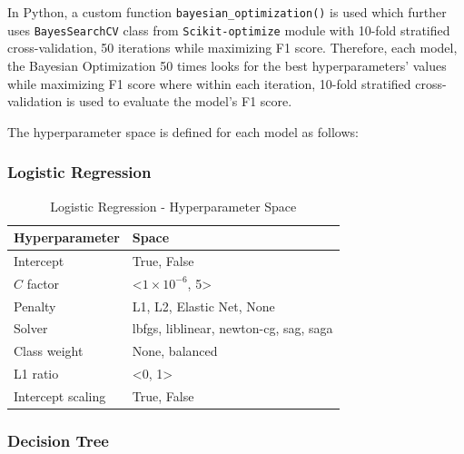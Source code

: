 In Python, a custom function \lstinline{bayesian_optimization()} is used which further uses \lstinline{BayesSearchCV} class from \lstinline{Scikit-optimize} module with 10-fold stratified cross-validation, 50 iterations while maximizing F1 score. Therefore, each model, the Bayesian Optimization 50 times looks for the best hyperparameters' values while maximizing F1 score where within each iteration, 10-fold stratified cross-validation is used to evaluate the model's F1 score.

The hyperparameter space is defined for each model as follows:
\subsubsection{Logistic Regression}

\begin{table}[H]
    \small
    \setlength{\tabcolsep}{8pt}
    \renewcommand{\arraystretch}{1.3}
    \centering
        \caption[Logistic Regression - Hyperparameter Space]{Logistic Regression - Hyperparameter Space}\label{tab:lrspace}
        \begin{tabular}{ll}
    \toprule
    \textbf{Hyperparameter} & \textbf{Space}\\
    \midrule
    \hline
    Intercept & True, False \\
    $C$ factor & <$1\times10^{-6}$, 5>\\
    Penalty & L1, L2, Elastic Net, None \\
    Solver & lbfgs, liblinear, newton-cg, sag, saga \\
    Class weight & None, balanced \\
    L1 ratio & <0, 1> \\
    Intercept scaling & True, False  \\
    \hline
    \bottomrule
    \end{tabular}
    \vspace{0.7em}

    \vspace{-1em}
\end{table}


\subsubsection{Decision Tree}

